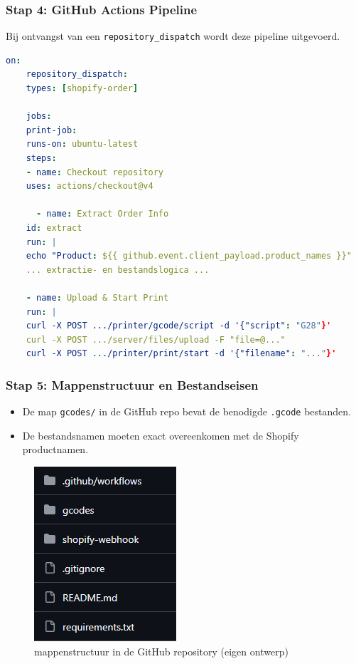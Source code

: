 \begin{enumerate}
\subsubsection{Stap 4: GitHub Actions Pipeline}

Bij ontvangst van een \texttt{repository\_dispatch} wordt deze pipeline uitgevoerd.

\begin{lstlisting}[language=yaml, caption=Shopify Order Print Pipeline (gedeeltelijk)]
    on:
    repository_dispatch:
    types: [shopify-order]
    
    jobs:
    print-job:
    runs-on: ubuntu-latest
    steps:
    - name: Checkout repository
    uses: actions/checkout@v4
    
      - name: Extract Order Info
    id: extract
    run: |
    echo "Product: ${{ github.event.client_payload.product_names }}"
    ... extractie- en bestandslogica ...
    
    - name: Upload & Start Print
    run: |
    curl -X POST .../printer/gcode/script -d '{"script": "G28"}'
    curl -X POST .../server/files/upload -F "file=@..."
    curl -X POST .../printer/print/start -d '{"filename": "..."}'
\end{lstlisting}

\subsubsection{Stap 5: Mappenstructuur en Bestandseisen}

\begin{itemize}
\item De map \texttt{gcodes/} in de GitHub repo bevat de benodigde \texttt{.gcode} bestanden.
\item De bestandsnamen moeten exact overeenkomen met de Shopify productnamen.
\end{itemize}

\begin{figure}[H]
    \centering
    \includegraphics[width=0.3\linewidth]{foto's/Github/Schermafbeelding 2025-04-22 161449.png}
    \caption{mappenstructuur in de GitHub repository (eigen ontwerp)}
    \label{fig:Github_Repo}
\end{figure}


\end{enumerate}

